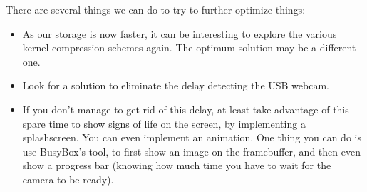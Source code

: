 There are several things we can do to try to further optimize things:

\begin{itemize}
\item As our storage is now faster, it can be interesting to explore the
various kernel compression schemes again. The optimum solution may be a
different one.
\item Look for a solution to eliminate the delay detecting the USB
webcam.
\item If you don't manage to get rid of this delay, at least take
advantage of this spare time to show signs of life on the screen, by
implementing a splashscreen. You can even implement an animation.
One thing you can do is use BusyBox's  tool, to first
show an image on the framebuffer, and then even show a progress bar
(knowing how much time you have to wait for the camera to be ready).
\end{itemize}

